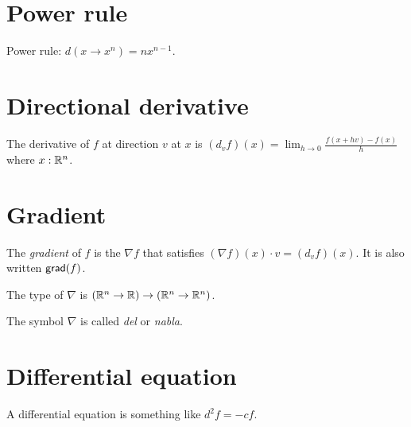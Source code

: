 \section{Power rule}

%
%
Power rule: \(d(x \to x^n) = n x^{n-1}\).

\section{Directional derivative}

%
%
The derivative of \(f\) at direction \(v\) at \(x\) is
\((d_v f)(x) = \lim_{h\to 0}\frac{f(x+h v)-f(x)}{h}\)
where \(x:\mathbb{R}^n\).

\section{Gradient}

%
The \emph{gradient} of \(f\) is the \(\nabla f\)
that satisfies \((\nabla f)(x) \cdot v = (d_v f)(x)\).
It is also written \(\textsf{grad}(f)\).

The type of \(\nabla\) is \((\mathbb{R}^n \to \mathbb{R}) \to (\mathbb{R}^n \to \mathbb{R}^n)\).

The symbol \(\nabla\) is called \emph{del} or \emph{nabla}.

\section{Differential equation}

%
A differential equation is something like \(d^2f = -cf\).

